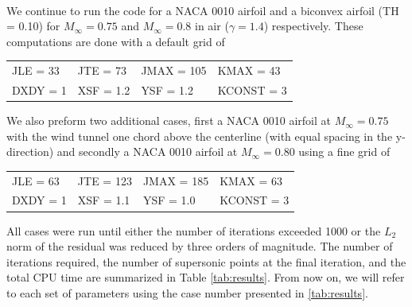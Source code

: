 \documentclass[12pt]{article}
\theoremstyle{definition}
\begin{document}

\vspace{1cm}


\\

We continue to run the code for a NACA 0010 airfoil and a biconvex airfoil (TH = 0.10) for $M_\infty = 0.75$ and $M_\infty = 0.8$ in air ($\gamma = 1.4$) respectively. These computations are done with a default grid of

\begin{center}
    \begin{tabular}{@{} l l l l @{}}
        JLE = 33  & JTE = 73  & JMAX = 105  & KMAX = 43 \\
        DXDY = 1  & XSF = 1.2  & YSF = 1.2  & KCONST = 3
    \end{tabular}    
\end{center}


We also preform two additional cases, first a NACA 0010 airfoil at $M_\infty = 0.75$ with the wind tunnel one chord above the centerline (with equal spacing in the y-direction) and secondly a NACA 0010 airfoil at $M_\infty = 0.80$ using a fine grid of

\begin{center}
    \begin{tabular}{@{} l l l l @{}}
        JLE = 63  & JTE = 123  & JMAX = 185  & KMAX = 63 \\
        DXDY = 1  & XSF = 1.1  & YSF = 1.0  & KCONST = 3
    \end{tabular}    
\end{center}

All cases were run until either the number of iterations exceeded 1000 or the $L_2$ norm of the residual was reduced by three orders of magnitude. The number of iterations required, the number of supersonic points at the final iteration, and the total CPU time are summarized in Table \ref{tab:results}. From now on, we will refer to each set of parameters using the case number presented in \ref{tab:results}.
\end{document}
